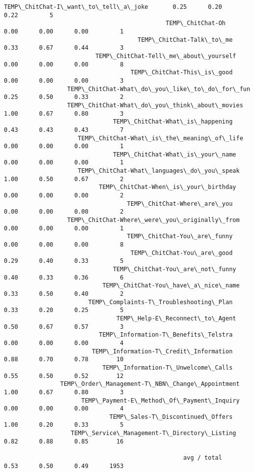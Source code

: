 \documentclass[11pt]{article}
\begin{document}
\begin{Verbatim}[commandchars=\\\{\}]
                           TEMP\_ChitChat-I\_want\_to\_tell\_a\_joke       0.25      0.20      0.22         5
                                              TEMP\_ChitChat-Oh       0.00      0.00      0.00         1
                                      TEMP\_ChitChat-Talk\_to\_me       0.33      0.67      0.44         3
                          TEMP\_ChitChat-Tell\_me\_about\_yourself       0.00      0.00      0.00         8
                                    TEMP\_ChitChat-This\_is\_good       0.00      0.00      0.00         3
                  TEMP\_ChitChat-What\_do\_you\_like\_to\_do\_for\_fun       0.25      0.50      0.33         2
                  TEMP\_ChitChat-What\_do\_you\_think\_about\_movies       1.00      0.67      0.80         3
                               TEMP\_ChitChat-What\_is\_happening       0.43      0.43      0.43         7
                     TEMP\_ChitChat-What\_is\_the\_meaning\_of\_life       0.00      0.00      0.00         1
                               TEMP\_ChitChat-What\_is\_your\_name       0.00      0.00      0.00         1
                     TEMP\_ChitChat-What\_languages\_do\_you\_speak       1.00      0.50      0.67         2
                           TEMP\_ChitChat-When\_is\_your\_birthday       0.00      0.00      0.00         2
                                   TEMP\_ChitChat-Where\_are\_you       0.00      0.00      0.00         2
                  TEMP\_ChitChat-Where\_were\_you\_originally\_from       0.00      0.00      0.00         1
                                   TEMP\_ChitChat-You\_are\_funny       0.00      0.00      0.00         8
                                    TEMP\_ChitChat-You\_are\_good       0.29      0.40      0.33         5
                               TEMP\_ChitChat-You\_are\_not\_funny       0.40      0.33      0.36         6
                            TEMP\_ChitChat-You\_have\_a\_nice\_name       0.33      0.50      0.40         2
                        TEMP\_Complaints-T\_Troubleshooting\_Plan       0.33      0.20      0.25         5
                                TEMP\_Help-E\_Reconnect\_to\_Agent       0.50      0.67      0.57         3
                           TEMP\_Information-T\_Benefits\_Telstra       0.00      0.00      0.00         4
                         TEMP\_Information-T\_Credit\_Information       0.88      0.70      0.78        10
                            TEMP\_Information-T\_Unwelcome\_Calls       0.55      0.50      0.52        12
                TEMP\_Order\_Management-T\_NBN\_Change\_Appointment       1.00      0.67      0.80         3
                      TEMP\_Payment-E\_Method\_Of\_Payment\_Inquiry       0.00      0.00      0.00         4
                              TEMP\_Sales-T\_Discontinued\_Offers       1.00      0.20      0.33         5
                   TEMP\_Service\_Management-T\_Directory\_Listing       0.82      0.88      0.85        16

                                                   avg / total       0.53      0.50      0.49      1953


    \end{Verbatim}
\end{document}

